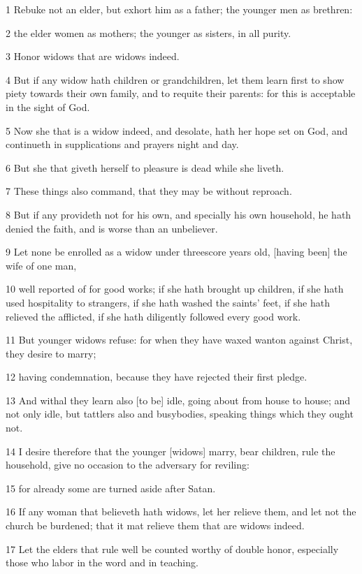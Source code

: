 \par 1 Rebuke not an elder, but exhort him as a father; the younger men as brethren:
\par 2 the elder women as mothers; the younger as sisters, in all purity.
\par 3 Honor widows that are widows indeed.
\par 4 But if any widow hath children or grandchildren, let them learn first to show piety towards their own family, and to requite their parents: for this is acceptable in the sight of God.
\par 5 Now she that is a widow indeed, and desolate, hath her hope set on God, and continueth in supplications and prayers night and day.
\par 6 But she that giveth herself to pleasure is dead while she liveth.
\par 7 These things also command, that they may be without reproach.
\par 8 But if any provideth not for his own, and specially his own household, he hath denied the faith, and is worse than an unbeliever.
\par 9 Let none be enrolled as a widow under threescore years old, [having been] the wife of one man,
\par 10 well reported of for good works; if she hath brought up children, if she hath used hospitality to strangers, if she hath washed the saints' feet, if she hath relieved the afflicted, if she hath diligently followed every good work.
\par 11 But younger widows refuse: for when they have waxed wanton against Christ, they desire to marry;
\par 12 having condemnation, because they have rejected their first pledge.
\par 13 And withal they learn also [to be] idle, going about from house to house; and not only idle, but tattlers also and busybodies, speaking things which they ought not.
\par 14 I desire therefore that the younger [widows] marry, bear children, rule the household, give no occasion to the adversary for reviling:
\par 15 for already some are turned aside after Satan.
\par 16 If any woman that believeth hath widows, let her relieve them, and let not the church be burdened; that it mat relieve them that are widows indeed.
\par 17 Let the elders that rule well be counted worthy of double honor, especially those who labor in the word and in teaching.
